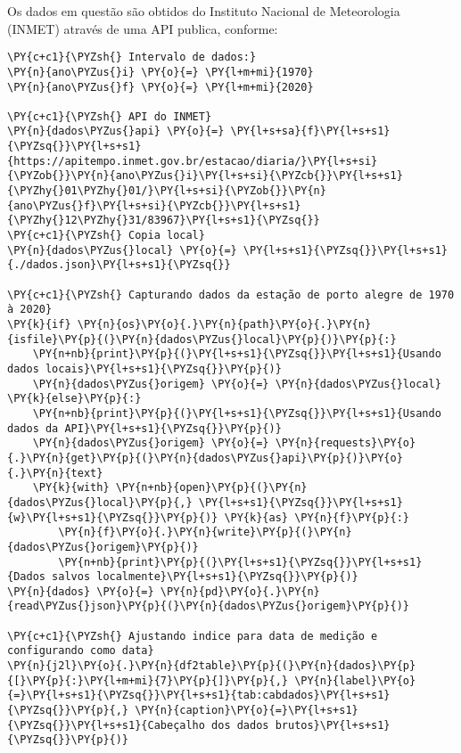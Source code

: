 Os dados em questão são obtidos do Instituto Nacional de Meteorologia
(INMET) através de uma API publica, conforme:

    \begin{tcolorbox}[breakable, size=fbox, boxrule=1pt, pad at break*=1mm,colback=cellbackground, colframe=cellborder]
\begin{Verbatim}[commandchars=\\\{\}]
\PY{c+c1}{\PYZsh{} Intervalo de dados:}
\PY{n}{ano\PYZus{}i} \PY{o}{=} \PY{l+m+mi}{1970}
\PY{n}{ano\PYZus{}f} \PY{o}{=} \PY{l+m+mi}{2020}

\PY{c+c1}{\PYZsh{} API do INMET}
\PY{n}{dados\PYZus{}api} \PY{o}{=} \PY{l+s+sa}{f}\PY{l+s+s1}{\PYZsq{}}\PY{l+s+s1}{https://apitempo.inmet.gov.br/estacao/diaria/}\PY{l+s+si}{\PYZob{}}\PY{n}{ano\PYZus{}i}\PY{l+s+si}{\PYZcb{}}\PY{l+s+s1}{\PYZhy{}01\PYZhy{}01/}\PY{l+s+si}{\PYZob{}}\PY{n}{ano\PYZus{}f}\PY{l+s+si}{\PYZcb{}}\PY{l+s+s1}{\PYZhy{}12\PYZhy{}31/83967}\PY{l+s+s1}{\PYZsq{}}
\PY{c+c1}{\PYZsh{} Copia local}
\PY{n}{dados\PYZus{}local} \PY{o}{=} \PY{l+s+s1}{\PYZsq{}}\PY{l+s+s1}{./dados.json}\PY{l+s+s1}{\PYZsq{}}

\PY{c+c1}{\PYZsh{} Capturando dados da estação de porto alegre de 1970 à 2020}
\PY{k}{if} \PY{n}{os}\PY{o}{.}\PY{n}{path}\PY{o}{.}\PY{n}{isfile}\PY{p}{(}\PY{n}{dados\PYZus{}local}\PY{p}{)}\PY{p}{:} 
    \PY{n+nb}{print}\PY{p}{(}\PY{l+s+s1}{\PYZsq{}}\PY{l+s+s1}{Usando dados locais}\PY{l+s+s1}{\PYZsq{}}\PY{p}{)}
    \PY{n}{dados\PYZus{}origem} \PY{o}{=} \PY{n}{dados\PYZus{}local}
\PY{k}{else}\PY{p}{:}
    \PY{n+nb}{print}\PY{p}{(}\PY{l+s+s1}{\PYZsq{}}\PY{l+s+s1}{Usando dados da API}\PY{l+s+s1}{\PYZsq{}}\PY{p}{)}
    \PY{n}{dados\PYZus{}origem} \PY{o}{=} \PY{n}{requests}\PY{o}{.}\PY{n}{get}\PY{p}{(}\PY{n}{dados\PYZus{}api}\PY{p}{)}\PY{o}{.}\PY{n}{text}
    \PY{k}{with} \PY{n+nb}{open}\PY{p}{(}\PY{n}{dados\PYZus{}local}\PY{p}{,} \PY{l+s+s1}{\PYZsq{}}\PY{l+s+s1}{w}\PY{l+s+s1}{\PYZsq{}}\PY{p}{)} \PY{k}{as} \PY{n}{f}\PY{p}{:}
        \PY{n}{f}\PY{o}{.}\PY{n}{write}\PY{p}{(}\PY{n}{dados\PYZus{}origem}\PY{p}{)}
        \PY{n+nb}{print}\PY{p}{(}\PY{l+s+s1}{\PYZsq{}}\PY{l+s+s1}{Dados salvos localmente}\PY{l+s+s1}{\PYZsq{}}\PY{p}{)}
\PY{n}{dados} \PY{o}{=} \PY{n}{pd}\PY{o}{.}\PY{n}{read\PYZus{}json}\PY{p}{(}\PY{n}{dados\PYZus{}origem}\PY{p}{)}

\PY{c+c1}{\PYZsh{} Ajustando indice para data de medição e configurando como data}
\PY{n}{j2l}\PY{o}{.}\PY{n}{df2table}\PY{p}{(}\PY{n}{dados}\PY{p}{[}\PY{p}{:}\PY{l+m+mi}{7}\PY{p}{]}\PY{p}{,} \PY{n}{label}\PY{o}{=}\PY{l+s+s1}{\PYZsq{}}\PY{l+s+s1}{tab:cabdados}\PY{l+s+s1}{\PYZsq{}}\PY{p}{,} \PY{n}{caption}\PY{o}{=}\PY{l+s+s1}{\PYZsq{}}\PY{l+s+s1}{Cabeçalho dos dados brutos}\PY{l+s+s1}{\PYZsq{}}\PY{p}{)}
\end{Verbatim}
\end{tcolorbox}

